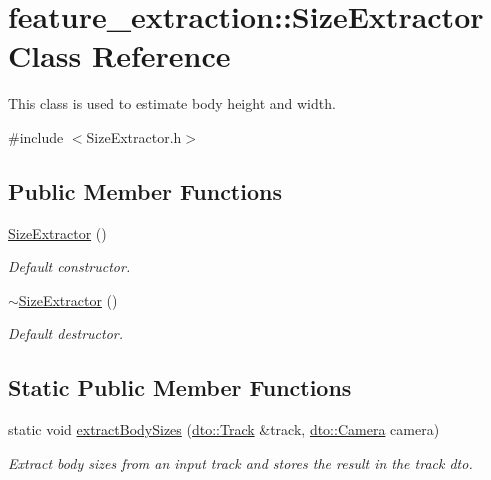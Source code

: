 \hypertarget{classfeature__extraction_1_1_size_extractor}{}\section{feature\+\_\+extraction\+:\+:Size\+Extractor Class Reference}
\label{classfeature__extraction_1_1_size_extractor}


This class is used to estimate body height and width.  




{\ttfamily \#include $<$Size\+Extractor.\+h$>$}

\subsection*{Public Member Functions}
\begin{DoxyCompactItemize}
\item 
\mbox{\label{classfeature__extraction_1_1_size_extractor_a316378d929602e6db870bbc05d2212fb}} 
\mbox{\hyperlink{classfeature__extraction_1_1_size_extractor_a316378d929602e6db870bbc05d2212fb}{Size\+Extractor}} ()
\begin{DoxyCompactList}\small\item\em Default constructor. \end{DoxyCompactList}\item 
\mbox{\label{classfeature__extraction_1_1_size_extractor_a3243b6fcad2f2b9519e782c118ed1c1c}} 
\mbox{\hyperlink{classfeature__extraction_1_1_size_extractor_a3243b6fcad2f2b9519e782c118ed1c1c}{$\sim$\+Size\+Extractor}} ()
\begin{DoxyCompactList}\small\item\em Default destructor. \end{DoxyCompactList}\end{DoxyCompactItemize}
\subsection*{Static Public Member Functions}
\begin{DoxyCompactItemize}
\item 
\mbox{\label{classfeature__extraction_1_1_size_extractor_ae8c2aafb19d712040ae4b6bc6cae1353}} 
static void \mbox{\hyperlink{classfeature__extraction_1_1_size_extractor_ae8c2aafb19d712040ae4b6bc6cae1353}{extract\+Body\+Sizes}} (\mbox{\hyperlink{structdto_1_1_track}{dto\+::\+Track}} \&track, \mbox{\hyperlink{structdto_1_1_camera}{dto\+::\+Camera}} camera)
\begin{DoxyCompactList}\small\item\em Extract body sizes from an input track and stores the result in the track dto. \end{DoxyCompactList}\end{DoxyCompactItemize}



